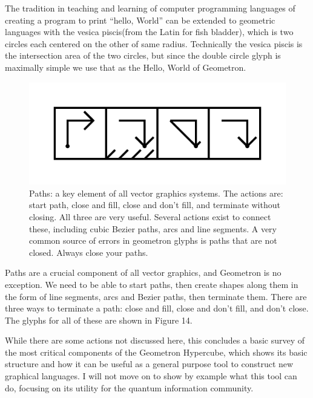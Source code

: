 \documentclass[11pt]{article}
\begin{document}
    The tradition in teaching and learning of computer programming languages of creating a program to print ``hello, World'' can be extended to geometric languages with the vesica piscis(from the Latin for fish bladder), which is two circles each centered on the other of same radius.  Technically the vesica piscis is the intersection area of the two circles, but since the double circle glyph is maximally simple we use that as the Hello, World of Geometron.



\begin{figure}

\includegraphics[width=\linewidth]{figures/figure14_paths.png}

\caption{Paths: a key element of all vector graphics systems.  The actions are: start path, close and fill, close and don't fill, and terminate without closing.  All three are very useful.  Several actions exist to connect these, including cubic Bezier paths, arcs and line segments.  A very common source of errors in geometron glyphs is paths that are not closed.  Always close your paths. }
\end{figure}


    Paths are a crucial component of all vector graphics, and Geometron is no exception.  We need to be able to start paths, then create shapes along them in the form of line segments, arcs and Bezier paths, then terminate them.  There are three ways to terminate a path: close and fill, close and don't fill, and don't close.  The glyphs for all of these are shown in Figure 14.  




    While there are some actions not discussed here, this concludes a basic survey of the most critical components of the Geometron Hypercube, which shows its basic structure and how it can be useful as a general purpose tool to construct new graphical languages.  I will not move on to show by example what this tool can do, focusing on its utility for the quantum information community.
\end{document}
